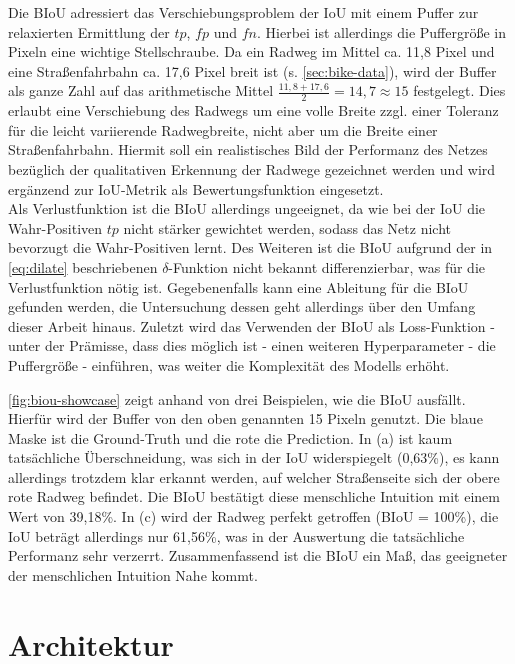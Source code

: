 Die \ac{BIoU} adressiert das Verschiebungsproblem der \ac{IoU} mit einem Puffer zur relaxierten Ermittlung der 
$tp$, $fp$ und $fn$. Hierbei ist allerdings die Puffergröße in Pixeln eine wichtige Stellschraube.  
Da ein Radweg im Mittel ca. 11,8 Pixel und eine Straßenfahrbahn ca. 17,6 Pixel breit ist (s. \autoref{sec:bike-data}), 
wird der Buffer als ganze Zahl auf das arithmetische Mittel $\frac{11,8 + 17,6}{2} = 14,7 \approx 15$ festgelegt. 
Dies erlaubt eine Verschiebung des Radwegs um eine volle Breite zzgl. einer Toleranz für die leicht variierende Radwegbreite, 
nicht aber um die Breite einer Straßenfahrbahn. Hiermit soll ein realistisches Bild der Performanz des Netzes 
bezüglich der qualitativen Erkennung der Radwege gezeichnet werden und wird ergänzend zur \ac{IoU}-Metrik 
als Bewertungsfunktion eingesetzt. \\
Als Verlustfunktion ist die \ac{BIoU} allerdings ungeeignet, da wie bei der \ac{IoU} die Wahr-Positiven $tp$ nicht 
stärker gewichtet werden, sodass das Netz nicht bevorzugt die Wahr-Positiven lernt. Des Weiteren ist die \ac{BIoU} aufgrund der 
in \autoref{eq:dilate} beschriebenen $\delta$-Funktion nicht bekannt differenzierbar, was für die Verlustfunktion nötig ist. 
Gegebenenfalls kann eine Ableitung für die \ac{BIoU} gefunden werden, 
die Untersuchung dessen geht allerdings über den Umfang dieser Arbeit hinaus. 
Zuletzt wird das Verwenden der \ac{BIoU} als Loss-Funktion - unter der Prämisse, dass dies möglich ist - einen weiteren 
Hyperparameter - die Puffergröße - einführen, was weiter die Komplexität des Modells erhöht.  

\autoref{fig:biou-showcase} zeigt anhand von drei Beispielen, wie die BIoU ausfällt. Hierfür wird 
der Buffer von den oben genannten 15 Pixeln genutzt. 
Die blaue Maske ist die Ground-Truth und die rote die Prediction. In (a) ist kaum 
tatsächliche Überschneidung, was sich in der IoU widerspiegelt (0,63\%), es kann allerdings trotzdem 
klar erkannt werden, auf welcher Straßenseite sich der obere rote Radweg befindet. Die BIoU 
bestätigt diese menschliche Intuition mit einem Wert von 39,18\%. In (c) wird der Radweg perfekt getroffen
(BIoU = 100\%), die IoU beträgt allerdings nur 61,56\%, was in der Auswertung die tatsächliche Performanz 
sehr verzerrt. Zusammenfassend ist die BIoU ein Maß, das geeigneter der menschlichen Intuition Nahe kommt.

\section{Architektur} \label{sec:architecture}

